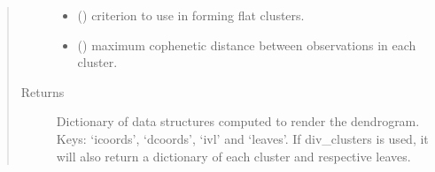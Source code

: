 \documentclass[letterpaper,10pt,english]{sphinxmanual}
\begin{document}
\begin{fulllineitems}
\begin{quote}
\begin{description}
\begin{itemize}
\item {} 
 () \textendash{} criterion to use in forming flat clusters.

\item {} 
 () \textendash{} maximum cophenetic distance between observations in each cluster.

\end{itemize}

\item[{Returns}] \leavevmode
Dictionary of data structures computed to render the dendrogram. Keys: ‘icoords’, ‘dcoords’, ‘ivl’ and ‘leaves’. If div\_clusters is used, it will also return a dictionary of each cluster and respective leaves.

\end{description}\end{quote}

\end{fulllineitems}

\end{document}
